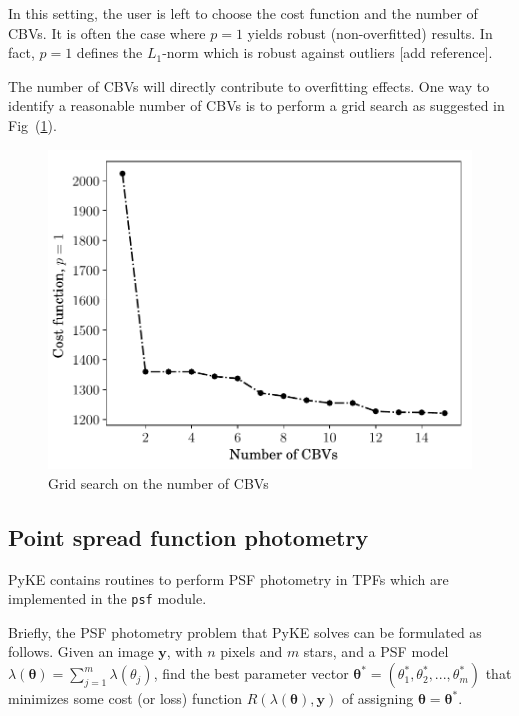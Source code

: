 \documentclass{article}
\begin{document}
In this setting, the user is left to choose the cost function and the number
of CBVs. It is often the case where $p=1$ yields robust (non-overfitted) results.
In fact, $p=1$ defines the $L_1$-norm which is robust against outliers [add reference].

The number of CBVs will directly contribute to overfitting effects. One
way to identify a reasonable number of CBVs is to perform a grid search
as suggested in Fig~(\ref{fig:cbv-grid-search}).

\begin{figure}[!htb]
    \centering
    \includegraphics[scale=.5]{figs/cbv-grid-search.pdf}
    \caption{Grid search on the number of CBVs}
    \label{fig:cbv-grid-search}
\end{figure}

\subsection{Point spread function photometry}

PyKE contains routines to perform PSF photometry in TPFs
which are implemented in the \texttt{psf} module.

Briefly, the PSF photometry problem that PyKE solves can be formulated as
follows. Given an image $\bm{y}$, with $n$ pixels and $m$ stars, and a PSF model
$\lambda(\bm{\theta}) = \sum_{j=1}^{m} \lambda({\theta}_j)$,
find the best parameter vector
$\bm{\theta}^{*} = (\theta_1^{*}, \theta_2^{*}, ..., \theta_m^{*})$
that minimizes some cost (or loss) function $R(\lambda(\bm{\theta}), \bm{y})$
of assigning $\bm{\theta} = \bm{\theta}^{*}$.
\end{document}

